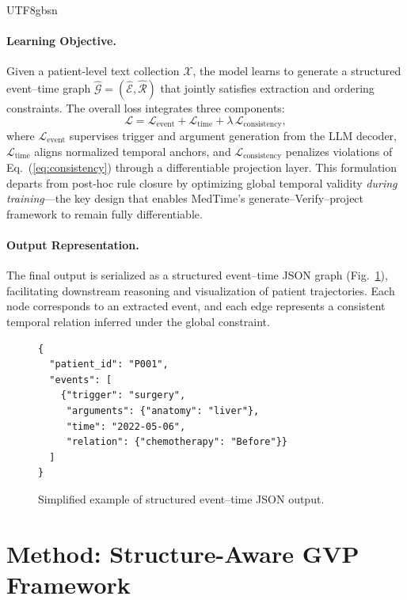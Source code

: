 \documentclass[11pt]{article}
\begin{document}
\begin{CJK*}{UTF8}{gbsn}
\paragraph{Learning Objective.}
Given a patient-level text collection $\mathcal{X}$, the model learns to generate a structured event--time graph $\hat{\mathcal{G}}=(\hat{\mathcal{E}},\hat{\mathcal{R}})$ that jointly satisfies extraction and ordering constraints. The overall loss integrates three components:
\begin{equation}
\label{eq:train_total}
\mathcal{L} =\mathcal{L}_{\text{event}} +\mathcal{L}_{\text{time}} +\lambda\,\mathcal{L}_{\text{consistency}},
\end{equation}
where $\mathcal{L}_{\text{event}}$ supervises trigger and argument generation from the LLM decoder, $\mathcal{L}_{\text{time}}$ aligns normalized temporal anchors, and $\mathcal{L}_{\text{consistency}}$ penalizes violations of Eq.~(\ref{eq:consistency}) through a differentiable projection layer. This formulation departs from post-hoc rule closure by optimizing global temporal validity \emph{during training}—the key design that enables MedTime’s generate–Verify–project framework to remain fully differentiable.

\paragraph{Output Representation.}
The final output is serialized as a structured event--time JSON graph (Fig.~\ref{fig:json}), facilitating downstream reasoning and visualization of patient trajectories. Each node corresponds to an extracted event, and each edge represents a consistent temporal relation inferred under the global constraint.

\begin{figure}[t]
\centering
\footnotesize
\begin{verbatim}
{
  "patient_id": "P001",
  "events": [
    {"trigger": "surgery",
     "arguments": {"anatomy": "liver"},
     "time": "2022-05-06",
     "relation": {"chemotherapy": "Before"}}
  ]
}
\end{verbatim}
\caption{Simplified example of structured event--time JSON output.}
\label{fig:json}
\end{figure}

\section{Method: Structure-Aware GVP Framework}
\label{sec:method}


\end{CJK*}
\end{document}

